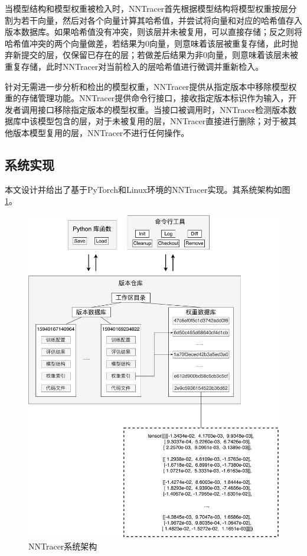 \documentclass{cjc}
\begin{document}
当模型结构和模型权重被检入时，NNTracer首先根据模型结构将模型权重按层分割为若干向量，然后对各个向量计算其哈希值，并尝试将向量和对应的哈希值存入版本数据库。如果哈希值没有冲突，则该层并未被复用，可以直接存储；反之则将哈希值冲突的两个向量做差，若结果为0向量，则意味着该层被重复存储，此时抛弃新提交的层，仅保留已存在的层；若做差后结果为非0向量，则意味着该层未被重复存储，此时NNTracer对当前检入的层哈希值进行微调并重新检入。

针对无需进一步分析和检出的模型权重，NNTracer提供从指定版本中移除模型权重的存储管理功能。NNTracer提供命令行接口，接收指定版本标识作为输入，开发者调用接口移除指定版本的模型权重。当接口被调用时，NNTracer检测版本数据库中该模型包含的层，对于未被复用的层，NNTracer直接进行删除；对于被其他版本模型复用的层，NNTracer不进行任何操作。

\subsection{系统实现}
本文设计并给出了基于PyTorch和Linux环境的NNTracer实现。其系统架构如图\ref{architecture}。

\begin{figure}[htb]
  \centering
  \includegraphics[width=\linewidth]{architecture.pdf}
  \caption{NNTracer系统架构}
  \label{architecture}
\end{figure}
\end{document}
